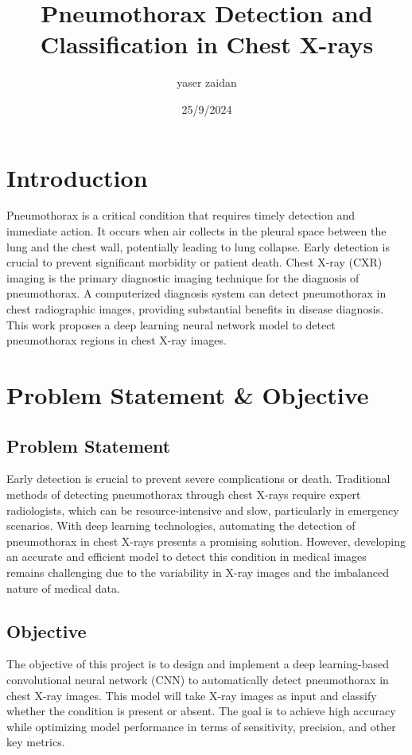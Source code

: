 \documentclass{article}
\title{Pneumothorax Detection and Classification in Chest X-rays}
\author{yaser zaidan}
\date{25/9/2024}
\begin{document}
\maketitle

\section*{Introduction}
Pneumothorax is a critical condition that requires timely detection and immediate action. It occurs when air collects in the pleural space between the lung and the chest wall, potentially leading to lung collapse. Early detection is crucial to prevent significant morbidity or patient death. Chest X-ray (CXR) imaging is the primary diagnostic imaging technique for the diagnosis of pneumothorax. A computerized diagnosis system can detect pneumothorax in chest radiographic images, providing substantial benefits in disease diagnosis. This work proposes a deep learning neural network model to detect pneumothorax regions in chest X-ray images.

\section*{Problem Statement \& Objective}
\subsection*{Problem Statement}
Early detection is crucial to prevent severe complications or death. Traditional methods of detecting pneumothorax through chest X-rays require expert radiologists, which can be resource-intensive and slow, particularly in emergency scenarios. With deep learning technologies, automating the detection of pneumothorax in chest X-rays presents a promising solution. However, developing an accurate and efficient model to detect this condition in medical images remains challenging due to the variability in X-ray images and the imbalanced nature of medical data.

\subsection*{Objective}
The objective of this project is to design and implement a deep learning-based convolutional neural network (CNN) to automatically detect pneumothorax in chest X-ray images. This model will take X-ray images as input and classify whether the condition is present or absent. The goal is to achieve high accuracy while optimizing model performance in terms of sensitivity, precision, and other key metrics.
\end{document}
